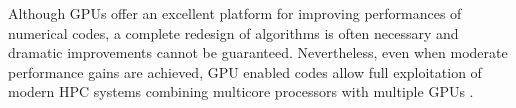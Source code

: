 \documentclass[1p]{elsarticle}
\begin{document}
Although GPUs offer an excellent platform for improving performances of numerical codes, a complete redesign of algorithms is often necessary and dramatic improvements cannot be guaranteed. Nevertheless, even when moderate performance gains are achieved, GPU enabled codes allow full exploitation of modern HPC systems combining multicore processors with multiple GPUs \cite{GPUTech}. 



	
\end{document}
